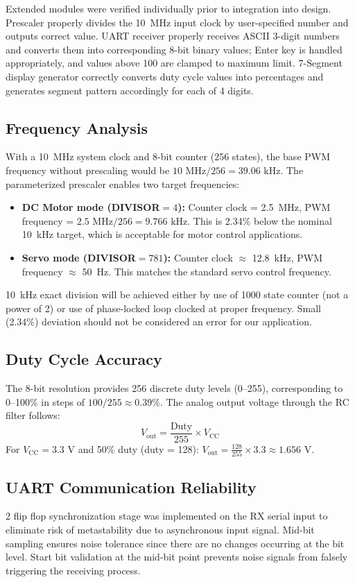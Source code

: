 \documentclass[12pt,a4paper]{article}
\begin{document}
Extended modules were verified individually prior to integration into design. Prescaler properly divides the 10~MHz input clock by user-specified number and outputs correct value. UART receiver properly receives ASCII 3-digit numbers and converts them into corresponding 8-bit binary values; Enter key is handled appropriately, and values above 100 are clamped to maximum limit. 7-Segment display generator correctly converts duty cycle values into percentages and generates segment pattern accordingly for each of 4 digits.

\subsection{Frequency Analysis}
With a 10~MHz system clock and 8-bit counter (256 states), the base PWM frequency without prescaling would be $10\text{ MHz} / 256 = 39.06\text{ kHz}$. The parameterized prescaler enables two target frequencies:

\begin{itemize}
\item \textbf{DC Motor mode (DIVISOR${}=4$):} Counter clock = 2.5~MHz, PWM frequency = $2.5\text{ MHz} / 256 = 9.766\text{ kHz}$. This is 2.34\% below the nominal 10~kHz target, which is acceptable for motor control applications.
\item \textbf{Servo mode (DIVISOR${}=781$):} Counter clock $\approx$ 12.8~kHz, PWM frequency $\approx$ 50~Hz. This matches the standard servo control frequency.
\end{itemize}

10~kHz exact division will be achieved either by use of 1000 state counter (not a power of 2) or use of phase-locked loop clocked at proper frequency. Small (2.34\%) deviation should not be considered an error for our application.

\subsection{Duty Cycle Accuracy}
The 8-bit resolution provides 256 discrete duty levels (0--255), corresponding to 0--100\% in steps of $100/255 \approx 0.39\%$. The analog output voltage through the RC filter follows:
\[
V_{\text{out}} = \frac{\text{Duty}}{255} \times V_{\text{CC}}
\]
For $V_{\text{CC}} = 3.3\text{ V}$ and 50\% duty (duty = 128): $V_{\text{out}} = \frac{128}{255} \times 3.3 \approx 1.656\text{ V}$.

\subsection{UART Communication Reliability}
2 flip flop synchronization stage was implemented on the RX serial input to eliminate risk of metastability due to asynchronous input signal. Mid-bit sampling ensures noise tolerance since there are no changes occurring at the bit level. Start bit validation at the mid-bit point prevents noise signals from falsely triggering the receiving process.
\end{document}
